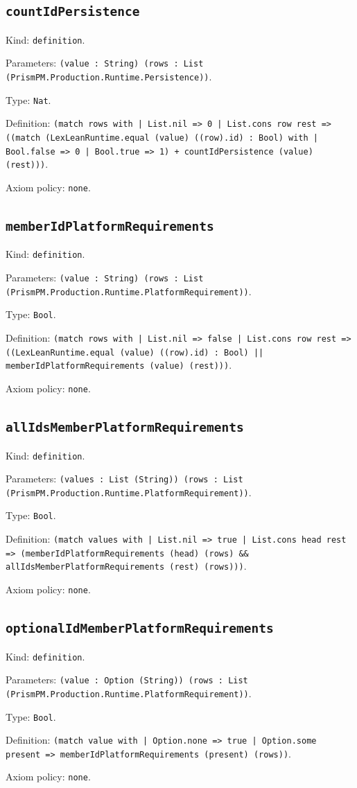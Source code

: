 \documentclass[11pt]{article}
\begin{document}
\subsection*{\texttt{countIdPersistence}}
\noindent Kind: \texttt{definition}.\par
\noindent Parameters: \texttt{(value : String) (rows : List (PrismPM.Production.Runtime.Persistence))}.\par
\noindent Type: \texttt{Nat}.\par
\noindent Definition: \texttt{(match rows with | List.nil => 0 | List.cons row rest => ((match (LexLeanRuntime.equal (value) ((row).id) : Bool) with | Bool.false => 0 | Bool.true => 1) + countIdPersistence (value) (rest)))}.\par
\noindent Axiom policy: \texttt{none}.\par
\subsection*{\texttt{memberIdPlatformRequirements}}
\noindent Kind: \texttt{definition}.\par
\noindent Parameters: \texttt{(value : String) (rows : List (PrismPM.Production.Runtime.PlatformRequirement))}.\par
\noindent Type: \texttt{Bool}.\par
\noindent Definition: \texttt{(match rows with | List.nil => false | List.cons row rest => ((LexLeanRuntime.equal (value) ((row).id) : Bool) || memberIdPlatformRequirements (value) (rest)))}.\par
\noindent Axiom policy: \texttt{none}.\par
\subsection*{\texttt{allIdsMemberPlatformRequirements}}
\noindent Kind: \texttt{definition}.\par
\noindent Parameters: \texttt{(values : List (String)) (rows : List (PrismPM.Production.Runtime.PlatformRequirement))}.\par
\noindent Type: \texttt{Bool}.\par
\noindent Definition: \texttt{(match values with | List.nil => true | List.cons head rest => (memberIdPlatformRequirements (head) (rows) \&\& allIdsMemberPlatformRequirements (rest) (rows)))}.\par
\noindent Axiom policy: \texttt{none}.\par
\subsection*{\texttt{optionalIdMemberPlatformRequirements}}
\noindent Kind: \texttt{definition}.\par
\noindent Parameters: \texttt{(value : Option (String)) (rows : List (PrismPM.Production.Runtime.PlatformRequirement))}.\par
\noindent Type: \texttt{Bool}.\par
\noindent Definition: \texttt{(match value with | Option.none => true | Option.some present => memberIdPlatformRequirements (present) (rows))}.\par
\noindent Axiom policy: \texttt{none}.\par
\end{document}
